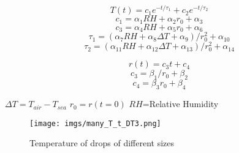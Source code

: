 \documentclass[10pt,a4paper]{article}
\begin{document}
\begin{enumerate}
\begin{enumerate}
\end{enumerate}

\[ T(t) = c_1e^{-t/\tau_1}+c_2e^{-t/\tau_2} \]
\[ c_1 = \alpha_1 RH + \alpha_2 r_0 + \alpha_3 \]
\[ c_3 = \alpha_4 RH + \alpha_5 r_0 + \alpha_6 \]
\[\tau_1 = (\alpha_7 RH+\alpha_8 \Delta T+\alpha_9)/r_0^2+\alpha_{10} \]
\[\tau_2 = (\alpha_{11} RH+\alpha_{12} \Delta T+\alpha_{13})/r_0^2+\alpha_{14} \]

\[ r(t) = c_3 t + c_4 \]
\[ c_3 = \beta_1/r_0+\beta_2 \]
\[ c_4 = \beta_3 r_0+\beta_4 \]
 
 \end{enumerate}
 
 $\Delta T= T_{air} - T_{sea}$ \qquad
 $r_0=r(t=0)$ \qquad
 $RH$=Relative Humidity 
 
 
 
 
\begin{figure}[!h]
\centering
\texttt{[image: imgs/many\_T\_t\_DT3.png]}
\caption{Temperature of drops of different sizes}
\end{figure}
 
 
 
 
 
\newpage



 
 
\end{document}
